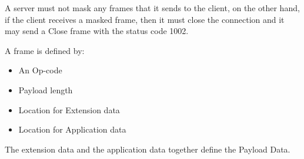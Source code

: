 A server must not mask any frames that it sends to the client, on the other hand, if the client receives a masked frame, then it must close the connection and it may send a Close frame with the status code 1002.\newline

A frame is defined by:
\begin{itemize}
	\item An Op-code
	\item Payload length
	\item Location for Extension data
	\item Location for Application data
\end{itemize}
	
The extension data and the application data together define the Payload Data.

